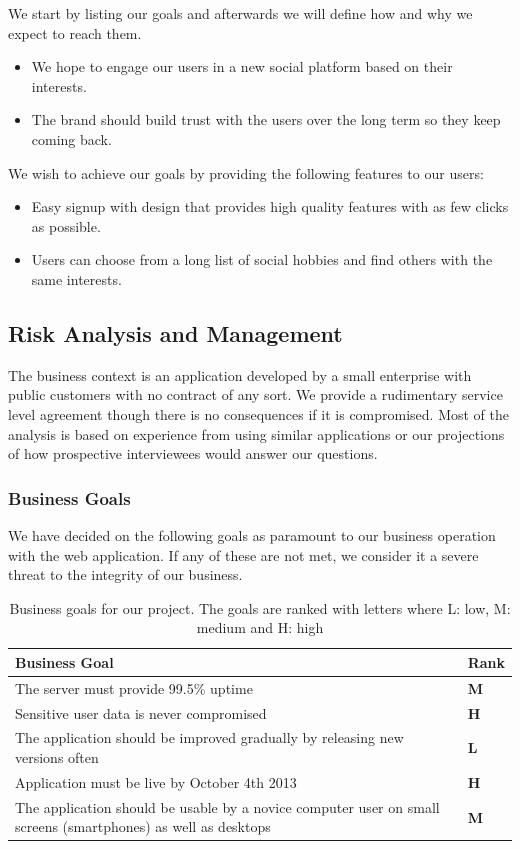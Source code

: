 \documentclass[a4paper]{article}
\begin{document}
We start by listing our goals and afterwards we will define how and why we expect to reach them.

\begin{itemize}
\item
We hope to engage our users in a new social platform based on their interests.
\item
The brand should build trust with the users over the long term so they keep coming back.
\end{itemize}

We wish to achieve our goals by providing the following features to our users:
\begin{itemize}
\item Easy signup with design that provides high quality features with as few clicks as possible.
\item Users can choose from a long list of social hobbies and find others with the same interests.
\end{itemize}

\subsection{Risk Analysis and Management}
The business context is an application developed by a small enterprise with public customers with no contract of any sort. We provide a rudimentary service level agreement though there is no consequences if it is compromised. Most of the analysis is based on experience from using similar applications or our projections of how prospective interviewees would answer our questions.
\subsubsection{Business Goals}
We have decided on the following goals as paramount to our business operation with the web application. If any of these are not met, we consider it a severe threat to the integrity of our business.

\begin{table}[h!]
	\begin{tabular}{|p{10cm}|l|}
		\hline
		\textbf{Business Goal} & \textbf{Rank} \\ \hline
		The server must provide 99.5\% uptime   & \textbf{M} \\ \hline
		Sensitive user data is never compromised & \textbf{H} \\ \hline
		The application should be improved gradually by releasing new versions often & \textbf{L} \\ \hline
		Application must be live by October 4th 2013 &	\textbf{H}\\ \hline
		The application should be usable by a novice computer user on small screens (smartphones) as well as desktops & \textbf{M}\\ \hline
	\end{tabular}
	\caption{Business goals for our project. The goals are ranked with letters where L: low, M: medium and H: high}
	\label{tab:business_goals}
\end{table}
\end{document}
